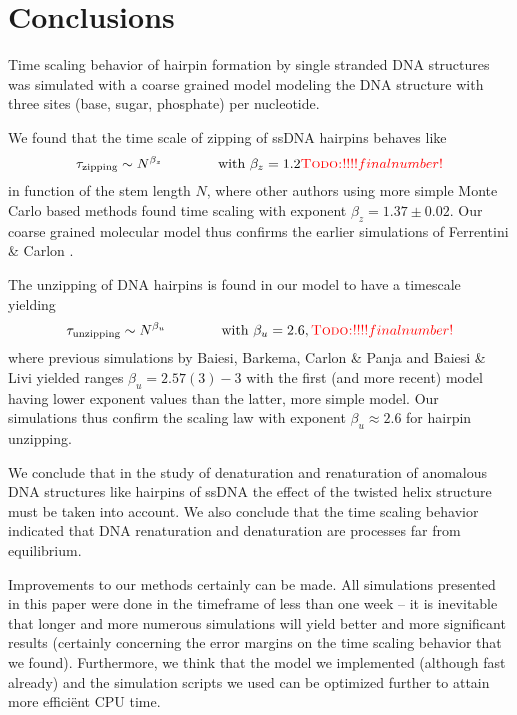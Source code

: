 \section{Conclusions}

Time scaling behavior of hairpin formation by single stranded DNA structures was simulated with a coarse grained model modeling the DNA structure with three sites (base, sugar, phosphate) per nucleotide.

We found that the time scale of zipping of ssDNA hairpins behaves like
\begin{equation}
\tau_\text{zipping} \sim N^{\beta_z} \qquad \qquad \text{with}\ \beta_z = 1.2 \textcolor{red}{\textsc{Todo:} !!!! final number!}
\end{equation}
in function of the stem length $N$, where other authors using more simple Monte Carlo based methods found time scaling with exponent $\beta_z = 1.37 \pm 0.02$. Our coarse grained molecular model thus confirms the earlier simulations of Ferrentini \& Carlon \cite{carlon2011anomalous}.

The unzipping of DNA hairpins is found in our model to have a timescale yielding
\begin{equation}
\tau_\text{unzipping} \sim N^{\beta_u} \qquad \qquad \text{with}\ \beta_u = 2.6,\textcolor{red}{\textsc{Todo:} !!!! final number!}
\end{equation}
where previous simulations by Baiesi, Barkema, Carlon \& Panja \cite{carlon2010unwinding} and Baiesi \& Livi \cite{baiesi2009multiple} yielded ranges $\beta_u = 2.57(3) - 3$ with the first (and more recent) model having lower exponent values than the latter, more simple model. Our simulations thus confirm the scaling law with exponent $\beta_u \approx 2.6$ for hairpin unzipping.

We conclude that in the study of denaturation and renaturation of anomalous DNA structures like hairpins of ssDNA the effect of the twisted helix structure must be taken into account. We also conclude that the time scaling behavior indicated that DNA renaturation and denaturation are processes far from equilibrium.

Improvements to our methods certainly can be made. All simulations presented in this paper were done in the timeframe of less than one week -- it is inevitable that longer and more numerous simulations will yield better and more significant results (certainly concerning the error margins on the time scaling behavior that we found). Furthermore, we think that the model we implemented (although fast already) and the simulation scripts we used can be optimized further to attain more effici\"ent CPU time.